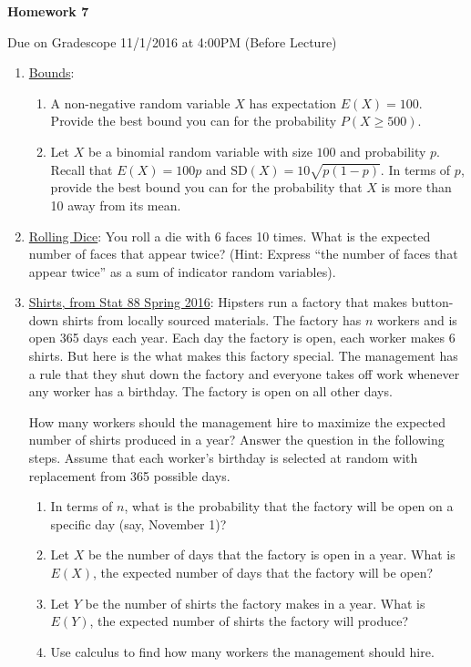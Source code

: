 \documentclass[11pt]{article}
\begin{document}
\centerline{\textbf{Homework 7}}
\centerline{Due on Gradescope 11/1/2016 at 4:00PM (Before Lecture)}

\begin{enumerate}
\item \underline{Bounds}:
    \begin{enumerate}
    \item A non-negative random variable $X$ has expectation $E(X) = 100$. Provide the best bound you can for the probability $P(X \geq 500)$.
    \item Let $X$ be a binomial random variable with size $100$ and probability $p$. Recall that $E(X) = 100p$ and $\mathrm{SD}(X) = 10\sqrt{p(1-p)}$. In terms of $p$, provide the best bound you can for the probability that $X$ is more than 10 away from its mean.
    \end{enumerate}

\item \underline{Rolling Dice}:
    You roll a die with 6 faces 10 times. What is the expected number of faces that appear twice? (Hint: Express ``the number of faces that appear twice'' as a sum of indicator random variables).

\item \underline{Shirts, from Stat 88 Spring 2016}: Hipsters run a factory that makes button-down shirts from locally sourced materials. 
The factory has $n$ workers and is open 365 days each year. 
Each day the factory is open, each worker makes 6 shirts. 
But here is the what makes this factory special. 
The management has a rule that they shut down the factory and everyone takes off work whenever any worker has a birthday. 
The factory is open on all other days. 

How many workers should the management hire to maximize the expected number of shirts produced in a year? Answer the question in the following steps. Assume that each worker's birthday is selected at random with replacement from 365 possible days.
    \begin{enumerate}
    \item In terms of $n$, what is the probability that the factory will be open on a specific day (say, November 1)?
    \item Let $X$ be the number of days that the factory is open in a year. What is $E(X)$, the expected number of days that the factory will be open?

    \item Let $Y$ be the number of shirts the factory makes in a year. What is $E(Y)$, the expected number of shirts the factory will produce?
    \item Use calculus to find how many workers the management should hire.
    \end{enumerate}


\end{enumerate}
\end{document}

